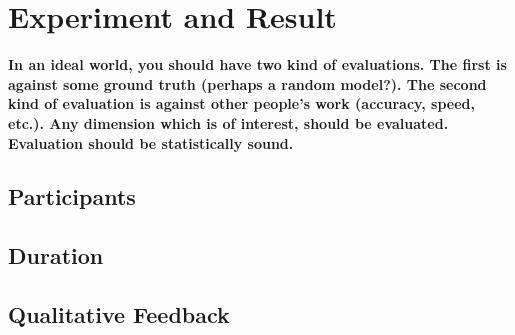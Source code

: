 \chapter{Experiment and Result}

\textbf{In an ideal world, you should have two kind of evaluations.  The first is against some ground truth (perhaps a random model?).  The second kind of evaluation is against other people's work (accuracy, speed, etc.).  Any dimension which is of interest, should be evaluated.  Evaluation should be statistically sound. }

\Blindtext
\section{Participants}
\section{Duration}
\section{Qualitative Feedback}